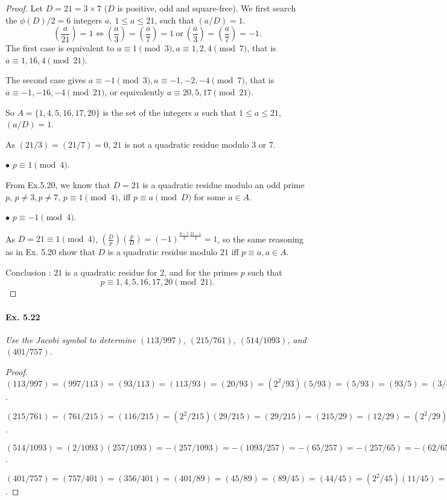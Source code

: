\documentclass[11pt,a4paper]{article}
\newcommand{\legendre}[2]{\genfrac{(}{)}{}{}{#1}{#2}}
\begin{document}
\begin{proof}
Let $D = 21 = 3 \times 7$ ($D$ is positive, odd and square-free). We first search the $\phi(D)/2 = 6$ integers $a, \ 1\leq a \leq 21$, such that $ (a/D) = 1$.
$$\legendre{a}{21} = 1 \iff \legendre{a}{3} = \legendre{a}{7}=1 \ \mathrm{or}\  \legendre{a}{3} = \legendre{a}{7}=-1.$$
The first case is equivalent to $a\equiv 1 \pmod 3, a\equiv 1,2,4 \pmod 7$, that is $a\equiv 1,16,4 \pmod {21}$.

The second case gives $a \equiv -1 \pmod 3, a \equiv -1,-2,-4 \pmod 7$,  that is $a \equiv -1,-16,-4\pmod {21}$, or equivalently $a \equiv 20,5,17 \pmod{ 21}$.

So $A = \{1,4,5,16,17,20\}$ is the set of the integers $a$ such that $1 \leq a \leq 21$, $(a/D)=1$.

As $(21/3) = (21/7) = 0$, $21$ is not a quadratic residue modulo $3$ or $7$.

$\bullet$ $p \equiv 1 \pmod 4$.

From Ex.5.20, we know that $D=21$ is a quadratic residue modulo an odd prime $p$, $p\neq 3, p\neq 7$, $p \equiv 1 \pmod {4}$, iff $p \equiv a \pmod D$ for some $a\in A$.

$\bullet$ $p \equiv -1 \pmod 4$.

As $D = 21 \equiv 1 \pmod 4$, $\legendre{D}{p} \legendre{p}{D} = (-1)^{\frac{p-1}{2}\frac{D-1}{2}} = 1$, so the same reasoning as in Ex. 5.20 show that $D$ is a quadratic residue modulo $21$ iff $p \equiv a, a \in A$.

Conclusion : $21$ is a quadratic residue for $2$, and for the primes $p$ such that $$p \equiv 1,4,5,16,17,20 \pmod {21}.$$
\end{proof}

\paragraph{Ex. 5.22}

{\it Use the Jacobi symbol to determine $(113/997)$, $(215/761)$, $(514/1093)$, and $(401/757)$.
}

\begin{proof}
$(113/997) = (997/113) = (93/113) = (113/93) = (20/93) = (2^2/93)(5/93) = (5/93) = (93/5) = (3/5) =(5/3) = (2/3) = -1$.

\medskip

$(215/761) = (761/215) = (116/215) = (2^2/215)(29/215) = (29/215) = (215/29) = (12/29) = (2^2/29)(3/29) = (3/29) = (29/3) = (2/3) = -1$.

\medskip

$(514/1093) = (2/1093)(257/1093) = - (257/1093) = -(1093/257) = -(65/257) = -(257/65) = -(62/65) = -(2/65) (31/65) = -(31/65) = -(65/31) = - (3/31) = (31/3) = (1/3) = 1$.

\medskip

$(401/757) = (757/401) = (356/401) = (401/89) = (45/89) = (89/45) = (44/45) = (2^2/45) (11/45) = (11/45) = (45/11) = (1/11) = 1$.
\end{proof}
\end{document}
